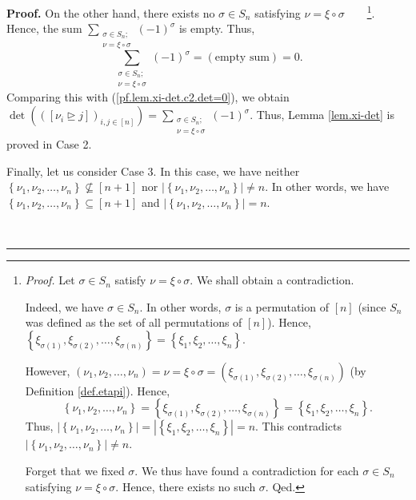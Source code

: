 \documentclass[numbers=enddot,12pt,final,onecolumn,notitlepage,english]{scrartcl}%
\theoremstyle{definition}
\newenvironment{proof}[1][Proof]{\noindent\textbf{#1.} }{\ \rule{0.5em}{0.5em}}
\let\sumnonlimits\sum
\renewcommand{\sum}{\sumnonlimits\limits}
\newenvironment{verlong}{}{}
\begin{document}
\begin{proof}
\begin{verlong}
On the other hand, there exists no $\sigma\in S_{n}$ satisfying $\nu=\xi
\circ\sigma$\ \ \ \ \footnote{\textit{Proof.} Let $\sigma\in S_{n}$ satisfy
$\nu=\xi\circ\sigma$. We shall obtain a contradiction.
\par
Indeed, we have $\sigma\in S_{n}$. In other words, $\sigma$ is a permutation
of $\left[  n\right]  $ (since $S_{n}$ was defined as the set of all
permutations of $\left[  n\right]  $). Hence, $\left\{  \xi_{\sigma\left(
1\right)  },\xi_{\sigma\left(  2\right)  },\ldots,\xi_{\sigma\left(  n\right)
}\right\}  =\left\{  \xi_{1},\xi_{2},\ldots,\xi_{n}\right\}  $.
\par
However, $\left(  \nu_{1},\nu_{2},\ldots,\nu_{n}\right)  =\nu=\xi\circ
\sigma=\left(  \xi_{\sigma\left(  1\right)  },\xi_{\sigma\left(  2\right)
},\ldots,\xi_{\sigma\left(  n\right)  }\right)  $ (by Definition
\ref{def.etapi}). Hence,
\[
\left\{  \nu_{1},\nu_{2},\ldots,\nu_{n}\right\}  =\left\{  \xi_{\sigma\left(
1\right)  },\xi_{\sigma\left(  2\right)  },\ldots,\xi_{\sigma\left(  n\right)
}\right\}  =\left\{  \xi_{1},\xi_{2},\ldots,\xi_{n}\right\}  .
\]
Thus, $\left\vert \left\{  \nu_{1},\nu_{2},\ldots,\nu_{n}\right\}  \right\vert
=\left\vert \left\{  \xi_{1},\xi_{2},\ldots,\xi_{n}\right\}  \right\vert =n$.
This contradicts $\left\vert \left\{  \nu_{1},\nu_{2},\ldots,\nu_{n}\right\}
\right\vert \neq n$.
\par
Forget that we fixed $\sigma$. We thus have found a contradiction for each
$\sigma\in S_{n}$ satisfying $\nu=\xi\circ\sigma$. Hence, there exists no such
$\sigma$. Qed.}. Hence, the sum $\sum_{\substack{\sigma\in S_{n};\\\nu
=\xi\circ\sigma}}\left(  -1\right)  ^{\sigma}$ is empty. Thus,%
\[
\sum_{\substack{\sigma\in S_{n};\\\nu=\xi\circ\sigma}}\left(  -1\right)
^{\sigma}=\left(  \text{empty sum}\right)  =0.
\]
Comparing this with (\ref{pf.lem.xi-det.c2.det=0}), we obtain $\det\left(
\left(  \left[  \nu_{i}\trianglerighteq j\right]  \right)  _{i,j\in\left[
n\right]  }\right)  =\sum_{\substack{\sigma\in S_{n};\\\nu=\xi\circ\sigma
}}\left(  -1\right)  ^{\sigma}$. Thus, Lemma \ref{lem.xi-det} is proved in
Case 2. \medskip
\end{verlong}

Finally, let us consider Case 3. In this case, we have neither $\left\{
\nu_{1},\nu_{2},\ldots,\nu_{n}\right\}  \not \subseteq \left[  n+1\right]  $
nor $\left\vert \left\{  \nu_{1},\nu_{2},\ldots,\nu_{n}\right\}  \right\vert
\neq n$. In other words, we have $\left\{  \nu_{1},\nu_{2},\ldots,\nu
_{n}\right\}  \subseteq\left[  n+1\right]  $ and $\left\vert \left\{  \nu
_{1},\nu_{2},\ldots,\nu_{n}\right\}  \right\vert =n$.


\end{proof}
\end{document}
